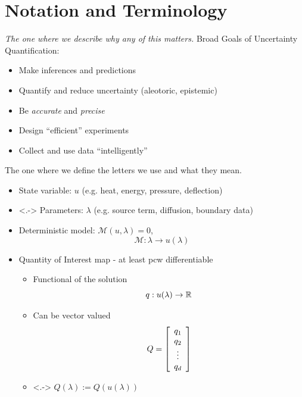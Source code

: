 %


\section{Notation and Terminology}
\begin{frame}[t]{\it The one where we describe why any of this matters.}
\centering
	Broad Goals of Uncertainty Quantification:
	\vskip 10pt
    \begin{itemize}
	    \item Make inferences and predictions
	    \vskip 20pt
        \item Quantify and reduce uncertainty (aleotoric, epistemic)
	    \vskip 20pt
	    \item Be \emph{accurate} and \emph{precise}
	    \vskip 20pt
	    \item Design ``efficient'' experiments
	    \vskip 20pt
	    \item Collect and use data ``intelligently''
    \end{itemize}

\end{frame}

\begin{frame}[t]{The one where we define the letters we use and what they mean.}
\begin{itemize}
	\item State variable: $u$ {\color{gray}(e.g. heat, energy, pressure, deflection)}
	\vskip 10pt
	\item<.-> Parameters: $\lambda$ {\color{gray}(e.g. source term, diffusion, boundary data)}
	\vskip 10pt
		\item Deterministic model: $\mathcal{M} (u, \lambda) = 0$, $$\mathcal{M}:\lambda \to u(\lambda)$$

	\item Quantity of Interest map  - at least pcw differentiable \vskip 5pt
		\begin{itemize}
		\item Functional of the solution $$q: u(\lambda) \to \RR$$
		\item Can be vector valued $$Q = \mat{c}{q_1\\ q_2\\ \vdots \\ q_d}$$
		\item<.-> $Q(\lambda) := Q(u(\lambda))$
	\end{itemize}

\end{itemize}

\end{frame}


